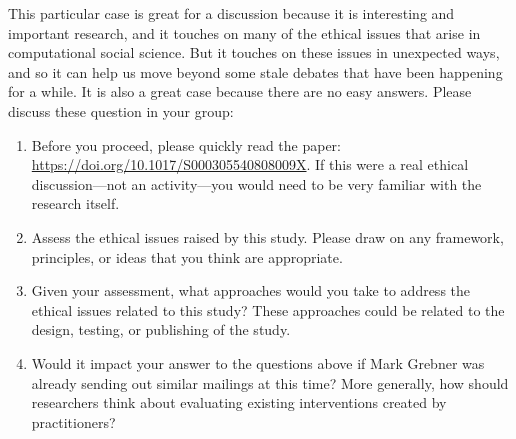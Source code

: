\documentclass{article}
\begin{document}
This particular case is great for a discussion because it is interesting and important research, and it touches on many of the ethical issues that arise in computational social science.  But it touches on these issues in unexpected ways, and so it can help us move beyond some stale debates that have been happening for a while.  It is also a great case because there are no easy answers.  Please discuss these question in your group:

\begin{enumerate}
\item Before you proceed, please quickly read the paper: \url{https://doi.org/10.1017/S000305540808009X}.  If this were a real ethical discussion---not an activity---you would need to be very familiar with the research itself.

\item Assess the ethical issues raised by this study.  Please draw on any framework, principles, or ideas that you think are appropriate.

\item Given your assessment, what approaches would you take to address the ethical issues related to this study?  These approaches could be related to the design, testing, or publishing of the study.

\item Would it impact your answer to the questions above if Mark Grebner was already sending out similar mailings at this time?  More generally, how should researchers think about evaluating existing interventions created by practitioners?
\end{enumerate}
 
\end{document}
